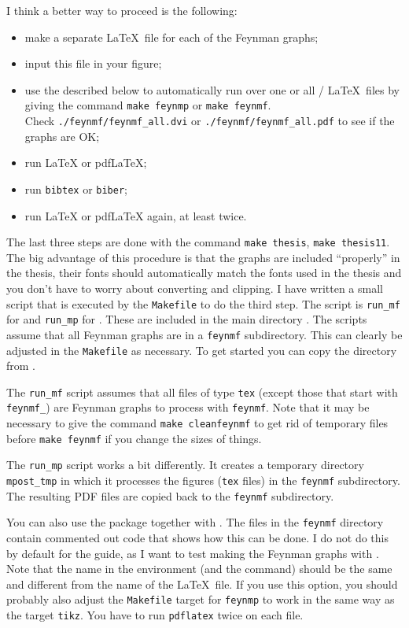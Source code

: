 I think a better way to proceed is the following:
\begin{itemize}
\item make a separate \LaTeX\ file for each of the Feynman graphs;
\item input this file in your figure;
\item use the  described below to automatically run
  over one or all / \LaTeX\ files by giving the
  command \texttt{make feynmp} or \texttt{make feynmf}.\\
  Check
  \texttt{./feynmf/feynmf\_all.dvi} or
  \texttt{./feynmf/feynmf\_all.pdf} to see if the graphs are OK\@;
\item run \LaTeX{} or pdf\LaTeX; %
\item run \texttt{bibtex} or \texttt{biber};
\item run \LaTeX{} or pdf\LaTeX{} again, at least twice.
\end{itemize}
The last three steps are done with the command \texttt{make thesis},
\texttt{make thesis11}.
The big advantage of this procedure is that the graphs are included
\enquote{properly} in the thesis, their fonts should automatically
match the fonts used in the thesis and you don't have to worry about
converting and clipping. I have written a small script that is
executed by the \texttt{Makefile} to do the third step.
The script is \texttt{run\_mf} for  and
\texttt{run\_mp} for . These are
included in the main directory .
The scripts assume that all Feynman graphs are in 
a \texttt{feynmf} subdirectory. This can clearly be
adjusted in the \texttt{Makefile} as necessary.
To get started you can copy the  directory from .

The \texttt{run\_mf} script assumes that all files of type
\texttt{tex} (except those that start with \texttt{feynmf\_}) are
Feynman graphs to process with \texttt{feynmf}. Note that it may be
necessary to give the command \texttt{make cleanfeynmf} to get rid of
temporary files before \texttt{make feynmf} if you change the sizes of
things.

The \texttt{run\_mp} script works a bit differently. It creates a
temporary directory \texttt{mpost\_tmp} in which it processes the
figures (\texttt{tex} files) in the \texttt{feynmf} subdirectory. The
resulting PDF files are copied back to the \texttt{feynmf}
subdirectory.

You can also use the package  together with
. The files in the \texttt{feynmf} directory contain
commented out code that shows how this can be done. I do not do this
by default for the guide, as I want
to test making the Feynman graphs with . Note that
the name in the  environment (and the 
command) should be the same and different from the name of the \LaTeX\
file. If you use this option, you should probably also adjust the
\texttt{Makefile} target for \texttt{feynmp} to work in the same way
as the target \texttt{tikz}. You have to run \texttt{pdflatex} twice
on each file.

